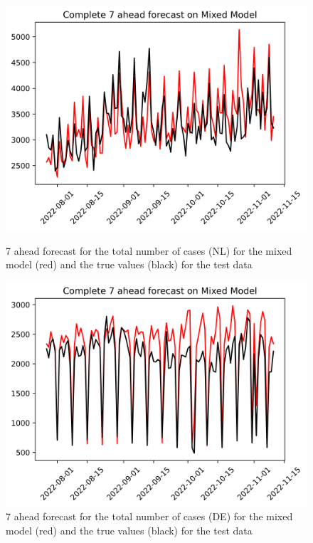 \begin{figure}

\begin{minipage}{.32\textwidth}
  \centering
  \includegraphics[width=\linewidth]{pics/7_ah/Complete_7_ahead_Mixed Model.png}
  \caption{7 ahead forecast for the total number of cases (NL) for the mixed model (red) and the true values (black) for the test data}
  \label{fig:tot_cases_fc_7_mix}
\end{minipage}
\begin{minipage}{.32\textwidth}
  \centering
  \includegraphics[width=\linewidth]{pics/7_ah/DE_Complete_7_ahead_Mixed Model.png}
  \caption{7 ahead forecast for the total number of cases (DE) for the mixed model (red) and the true values (black) for the test data}

\end{minipage}
\end{figure}
